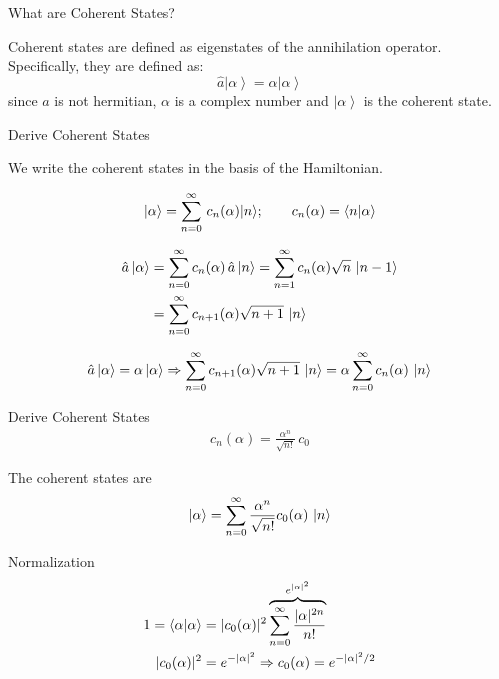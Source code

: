 \documentclass{loyola-beamer}
\begin{document}
\begin{frame}{What are Coherent States?}

    Coherent states are defined as eigenstates of the annihilation operator. Specifically, they are defined as:
    \begin{equation}
        \hat{a} \left| \alpha \right\rangle = \alpha \left| \alpha \right\rangle
    \end{equation}
    since $\hat{a}$ is not hermitian, $\alpha$ is a complex number and $\left|\alpha\right\rangle$ is the coherent state.

\end{frame}

\begin{frame}{Derive Coherent States}

    We write the coherent states in the basis of the Hamiltonian.

    \begin{align*}
        | \alpha \rangle  = \sum_{n=0}^{\infty} \, c_n(\alpha) |n \rangle;
        \qquad c_n(\alpha) = \bra{n} \ket{\alpha}
    \end{align*}

    \begin{align*}
        \hat{a} \ket{\alpha} & = \sum_{n=0}^\infty c_n(\alpha)\, \hat{a} \ket{n}
        = \sum_{n=1}^\infty c_n(\alpha)\sqrt{n}\, \ket{n-1}                            \\
                             & = \sum_{n=0}^\infty c_{n+1}(\alpha)\sqrt{n+1}\, \ket{n}
    \end{align*}

    \begin{align*}
        \hat{a} \ket{\alpha} = \alpha \ket{\alpha} \Rightarrow
        \sum_{n=0}^\infty c_{n+1}(\alpha)\sqrt{n+1}\, \ket{n}
        = \alpha \sum_{n=0}^\infty c_{n}(\alpha)\, \ket{n}
    \end{align*}

\end{frame}

\begin{frame}{Derive Coherent States}
    \begin{align*}
        c_n(\alpha) = \frac{\alpha^n}{\sqrt{n!}}\, c_0
    \end{align*}

    The coherent states are
    \begin{align*}
        \ket{\alpha} = \sum_{n=0}^\infty \frac{\alpha^n}{\sqrt{n!}} c_0(\alpha) \, \ket{n}
    \end{align*}

    Normalization
    \begin{align*}
        1= \bra{\alpha}\ket{\alpha} & = | c_0(\alpha) |^2
        \overbrace{\sum_{n=0}^\infty \frac{|\alpha|^{2n}}{n!}}^{e^{|\alpha|^2}} \\
        | c_0(\alpha) |^2           & = e^{-|\alpha|^2}
        \Rightarrow c_0(\alpha) = e^{-|\alpha|^2/2}
    \end{align*}



\end{frame}
\end{document}
